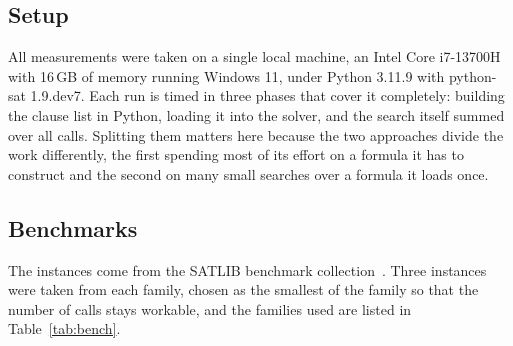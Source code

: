 \documentclass[11pt,a4paper]{article}
\begin{document}
\subsection*{Setup}

All measurements were taken on a single local machine, an Intel Core
i7-13700H with 16\,GB of memory running Windows 11, under Python 3.11.9
with python-sat 1.9.dev7. Each run is timed in three phases that cover it
completely: building the clause list in Python, loading it into the solver,
and the search itself summed over all calls. Splitting them matters here
because the two approaches divide the work differently, the first spending
most of its effort on a formula it has to construct and the second on many
small searches over a formula it loads once.

\subsection*{Benchmarks}

The instances come from the SATLIB benchmark collection~\cite{satlib}. Three instances were
taken from each family, chosen as the smallest of the family so that the
number of calls stays workable, and the families used are listed in
Table~\ref{tab:bench}.
\end{document}
